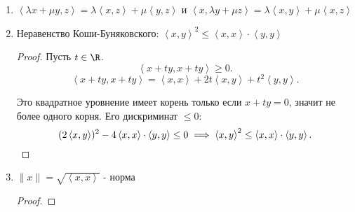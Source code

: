\begin{properties} \thmslashn

    \begin{enumerate}
        \item $\left<\lambda x + \mu y, z\right> = \lambda \left<x, z\right> + \mu \left<y, z\right>$ и $\left<x, \lambda y + \mu z\right> = \lambda \left<x, y\right> + \mu \left<x, z\right>$
        \item Неравенство Коши-Буняковского: $\left<x, y\right>^2 \le \left<x, x\right> \cdot \left<y, y\right>$
            \begin{proof} \thmslashn
            
            
                Пусть $t\in \R$.
                \[ \left<x + ty, x + ty\right> \ge 0 .\] 
                \[ \left<x + ty, x + ty\right> = \left<x, x\right> + 2t\left<x, y\right> + t^2\left<y, y\right> .\]

                Это квадратное уровнение имеет корень только если $x+ty = 0$, значит не более одного корня. Его дискриминат $\le 0$:
                \[ (2 \left<x, y\right>)^2 - 4 \left<x, x\right> \cdot \left<y, y\right> \le 0 \implies \left<x, y\right>^2 \le \left<x, x\right> \cdot \left<y, y\right> .\qedhere\] 
            \end{proof}
        \item $\|x\| = \sqrt{\left<x, x\right>}$ - норма
            \begin{proof} \thmslashn
            

\end{proof}
\end{enumerate}
\end{properties}
